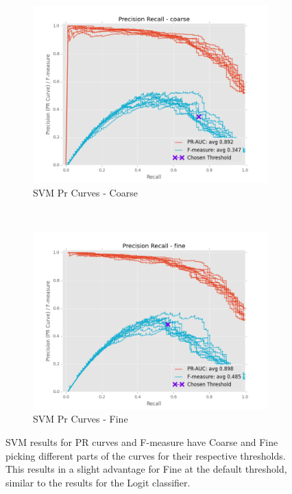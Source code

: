 \documentclass[ms]{nuthesis}
\begin{document}
\FloatBarrier
\begin{figure}[!htb]
    \centering
    \begin{subfigure}[t]{0.5\textwidth}
        \centering
        \includegraphics[width=\textwidth]{fig/SVM_FindThreshold_PrCurve_coarse}
        \caption{SVM Pr Curves - Coarse}
    \end{subfigure}%
    ~
    \begin{subfigure}[t]{0.5\textwidth}
        \centering
        \includegraphics[width=\textwidth]{fig/SVM_FindThreshold_PrCurve_fine}
        \caption{SVM Pr Curves - Fine}
    \end{subfigure}
    \caption{SVM results for PR curves and F-measure have Coarse and Fine picking
    different parts of the curves for their respective thresholds. This results in a slight
    advantage for Fine at the default threshold, similar to the results for the Logit classifier.}
    \label{fig:SVMThreshPr}
\end{figure}
\FloatBarrier
\end{document}
